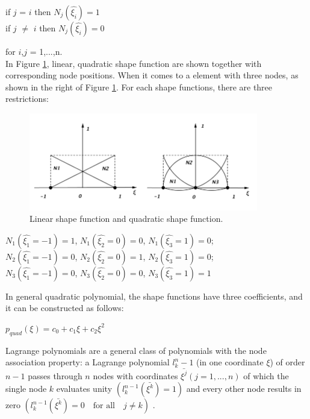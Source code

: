 \begin{center}
	if $j$ = $i$ then $N_j\left(\hat{\xi_i}\right) = 1$ \\
	if $j$ $\neq$ $i$ then $N_j\left(\hat{\xi_i}\right) = 0$
\end{center}

for $i$,$j$ = 1,...,n. \\
In Figure \ref{fig: shape_func}, linear, quadratic shape function are shown together with corresponding node positions. When it comes to a element with three nodes, as shown in the right of Figure \ref{fig: shape_func}. For each shape functions, there are three restrictions:

\begin{figure}
	\begin{center}
		\includegraphics[width=10cm,clip]{shape_func.pdf} 		
		\caption{Linear shape function and quadratic shape function.} \label{fig: shape_func}	
	\end{center}
\end{figure}

\begin{center}
	$N_1\left(\hat{\xi_1} = -1\right) = 1$, $N_1\left(\hat{\xi_2} = 0\right) = 0$, $N_1\left(\hat{\xi_3} = 1\right) = 0$;\\
	$N_2\left(\hat{\xi_1} = -1\right) = 0$, $N_2\left(\hat{\xi_2} = 0\right) = 1$, $N_2\left(\hat{\xi_3} = 1\right) = 0$;\\
	$N_3\left(\hat{\xi_1} = -1\right) = 0$, $N_3\left(\hat{\xi_2} = 0\right) = 0$, $N_3\left(\hat{\xi_3} = 1\right) = 1$
\end{center}

In general quadratic polynomial, the shape functions have three coefficients, and it can be constructed as follows:
\begin{center}
	$p_{quad}\left(\xi\right) = c_0 + c_1\xi + c_2\xi^2$
\end{center}

Lagrange polynomials are a general class of polynomials with the node association property: a Lagrange polynomial $l_k^n-1$ (in one coordinate $\xi$) of order $n-1$ passes through $n$ nodes with coordinates $\bar{\xi^j}\left(j = 1,...,n\right)$ of which the single node $k$ evaluates unity $\left(l_k^{n-1} \left(\bar{\xi^k}\right)=1\right)$ and every other node results in zero $\left(l_k^{n-1} \left(\bar{\xi^k}\right)=0  \quad \text{for all} \quad j \neq k\right)$ .

